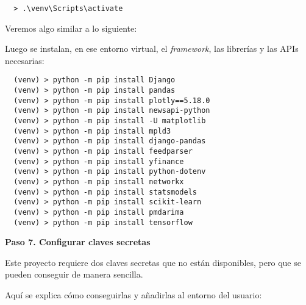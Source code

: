 \begin{verbatim}
  > .\venv\Scripts\activate
\end{verbatim}

Veremos algo similar a lo siguiente: 


\newpage

Luego se instalan, en ese entorno virtual, el \emph{framework}, las librerías y las APIs necesarias:

\begin{verbatim}
  (venv) > python -m pip install Django
  (venv) > python -m pip install pandas
  (venv) > python -m pip install plotly==5.18.0
  (venv) > python -m pip install newsapi-python
  (venv) > python -m pip install -U matplotlib
  (venv) > python -m pip install mpld3
  (venv) > python -m pip install django-pandas
  (venv) > python -m pip install feedparser
  (venv) > python -m pip install yfinance
  (venv) > python -m pip install python-dotenv
  (venv) > python -m pip install networkx
  (venv) > python -m pip install statsmodels
  (venv) > python -m pip install scikit-learn
  (venv) > python -m pip install pmdarima
  (venv) > python -m pip install tensorflow
\end{verbatim}

\textbf{Paso 7. Configurar claves secretas}

Este proyecto requiere dos claves secretas que no están disponibles, pero que se pueden conseguir de manera sencilla.

Aquí se explica cómo conseguirlas y añadirlas al entorno del usuario:

